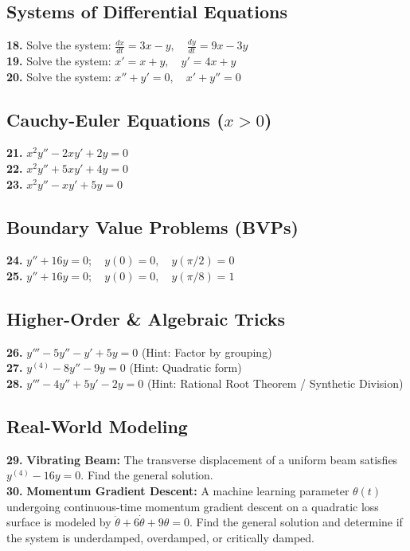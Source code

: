 \documentclass[12pt]{article}
\begin{document}
\subsection*{Systems of Differential Equations}
\textbf{18.} Solve the system: $\frac{dx}{dt} = 3x - y, \quad \frac{dy}{dt} = 9x - 3y$ \\
\textbf{19.} Solve the system: $x' = x + y, \quad y' = 4x + y$ \\
\textbf{20.} Solve the system: $x'' + y' = 0, \quad x' + y'' = 0$

\subsection*{Cauchy-Euler Equations ($x > 0$)}
\textbf{21.} $x^2y'' - 2xy' + 2y = 0$ \\
\textbf{22.} $x^2y'' + 5xy' + 4y = 0$ \\
\textbf{23.} $x^2y'' - xy' + 5y = 0$

\subsection*{Boundary Value Problems (BVPs)}
\textbf{24.} $y'' + 16y = 0; \quad y(0)=0, \quad y(\pi/2)=0$ \\
\textbf{25.} $y'' + 16y = 0; \quad y(0)=0, \quad y(\pi/8)=1$

\subsection*{Higher-Order \& Algebraic Tricks}
\textbf{26.} $y''' - 5y'' - y' + 5y = 0$ (Hint: Factor by grouping) \\
\textbf{27.} $y^{(4)} - 8y'' - 9y = 0$ (Hint: Quadratic form) \\
\textbf{28.} $y''' - 4y'' + 5y' - 2y = 0$ (Hint: Rational Root Theorem / Synthetic Division)

\subsection*{Real-World Modeling}
\textbf{29.} \textbf{Vibrating Beam:} The transverse displacement of a uniform beam satisfies $y^{(4)} - 16y = 0$. Find the general solution. \\
\textbf{30.} \textbf{Momentum Gradient Descent:} A machine learning parameter $\theta(t)$ undergoing continuous-time momentum gradient descent on a quadratic loss surface is modeled by $\ddot{\theta} + 6\dot{\theta} + 9\theta = 0$. Find the general solution and determine if the system is underdamped, overdamped, or critically damped.
\end{document}
